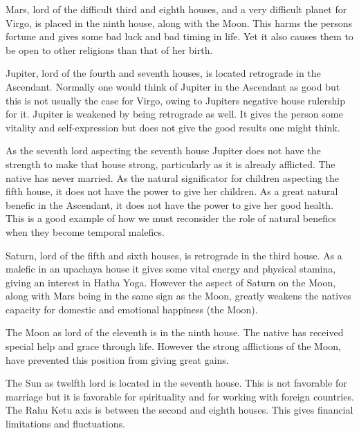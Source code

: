  

Mars, lord of the difficult third and eighth houses, and a very difficult planet for Virgo, is placed in the ninth house, along with the Moon. This harms the persons fortune and gives some bad luck and bad timing in life. Yet it also causes them to be open to other religions than that of her birth.

 

Jupiter, lord of the fourth and seventh houses, is located retrograde in the Ascendant. Normally one would think of Jupiter in the Ascendant as good but this is not usually the case for Virgo, owing to Jupiters negative house rulership for it. Jupiter is weakened by being retrograde as well. It gives the person some vitality and self-expression but does not give the good results one might think.

 

As the seventh lord aspecting the seventh house Jupiter does not have the strength to make that house strong, particularly as it is already afflicted. The native has never married. As the natural significator for children aspecting the fifth house, it does not have the power to give her children. As a great natural benefic in the Ascendant, it does not have the power to give her good health. This is a good example of how we must reconsider the role of natural benefics when they become temporal malefics.

 

Saturn, lord of the fifth and sixth houses, is retrograde in the third house. As a malefic in an upachaya house it gives some vital energy and physical stamina, giving an interest in Hatha Yoga. However the aspect of Saturn on the Moon, along with Mars being in the same sign as the Moon, greatly weakens the natives capacity for domestic and emotional happiness (the Moon).

 

The Moon as lord of the eleventh is in the ninth house. The native has received special help and grace through life. However the strong afflictions of the Moon, have prevented this position from giving great gains.

 

The Sun as twelfth lord is located in the seventh house. This is not favorable for marriage but it is favorable for spirituality and for working with foreign countries. The Rahu Ketu axis is between the second and eighth houses. This gives financial limitations and fluctuations.

 

